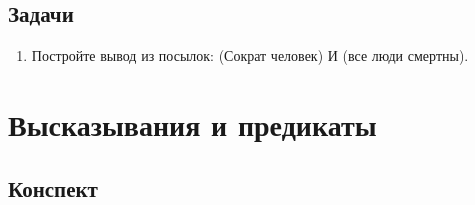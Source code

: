 \subsection{Задачи}
\begin{enumerate}
\item Постройте вывод из посылок: (Сократ человек) И (все люди смертны).
\end{enumerate}


\section{Высказывания и предикаты}

\subsection{Конспект}
